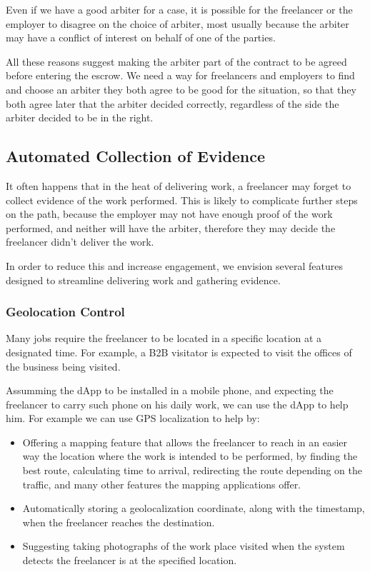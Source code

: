 \documentclass{article}
\begin{document}
Even if we have a good arbiter for a case, it is possible for the freelancer or the employer to disagree on the choice of arbiter, most usually because the arbiter may have a conflict of interest on behalf of one of the parties.

All these reasons suggest making the arbiter part of the contract to be agreed before entering the escrow. We need a way for freelancers and employers to find and choose an arbiter they both agree to be good for the situation, so that they both agree later that the arbiter decided correctly, regardless of the side the arbiter decided to be in the right.

\subsection{Automated Collection of Evidence}

It often happens that in the heat of delivering work, a freelancer may forget to collect evidence of the work performed. This is likely to complicate further steps on the path, because the employer may not have enough proof of the work performed, and neither will have the arbiter, therefore they may decide the freelancer didn't deliver the work.

In order to reduce this and increase engagement, we envision several features designed to streamline delivering work and gathering evidence.

\subsubsection{Geolocation Control}

Many jobs require the freelancer to be located in a specific location at a designated time. For example, a B2B visitator is expected to visit the offices of the business being visited.

Assumming the dApp to be installed in a mobile phone, and expecting the freelancer to carry such phone on his daily work, we can use the dApp to help him. For example we can use GPS localization to help by:

\begin{itemize}
  \item Offering a mapping feature that allows the freelancer to reach in an easier way the location where the work is intended to be performed, by finding the best route, calculating time to arrival, redirecting the route depending on the traffic, and many other features the mapping applications offer.
  \item Automatically storing a geolocalization coordinate, along with the timestamp, when the freelancer reaches the destination.
  \item Suggesting taking photographs of the work place visited when the system detects the freelancer is at the specified location.
\end{itemize}
\end{document}

